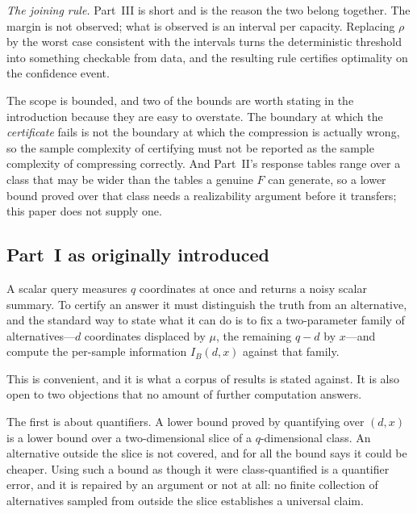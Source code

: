 \emph{The joining rule.} Part~III is short and is the reason the two belong together. The
margin is not observed; what is observed is an interval per capacity. Replacing $\rho$ by the
worst case consistent with the intervals turns the deterministic threshold into something
checkable from data, and the resulting rule certifies optimality on the confidence event.

The scope is bounded, and two of the bounds are worth stating in the introduction because
they are easy to overstate. The boundary at which the \emph{certificate} fails is not the
boundary at which the compression is actually wrong, so the sample complexity of certifying
must not be reported as the sample complexity of compressing correctly. And Part~II's
response tables range over a class that may be wider than the tables a genuine $F$ can
generate, so a lower bound proved over that class needs a realizability argument before it
transfers; this paper does not supply one.


\subsection{Part~I as originally introduced}


A scalar query measures $q$ coordinates at once and returns a noisy scalar summary. To
certify an answer it must distinguish the truth from an alternative, and the standard way to
state what it can do is to fix a two-parameter family of alternatives---$d$ coordinates
displaced by $\mu$, the remaining $q-d$ by $x$---and compute the per-sample information
$I_{B}(d,x)$ against that family.

This is convenient, and it is what a corpus of results is stated against. It is also open to
two objections that no amount of further computation answers.

The first is about quantifiers. A lower bound proved by quantifying over $(d,x)$ is a lower
bound over a two-dimensional slice of a $q$-dimensional class. An alternative outside the
slice is not covered, and for all the bound says it could be cheaper. Using such a bound as
though it were class-quantified is a quantifier error, and it is repaired by an argument or
not at all: no finite collection of alternatives sampled from outside the slice establishes a
universal claim.

